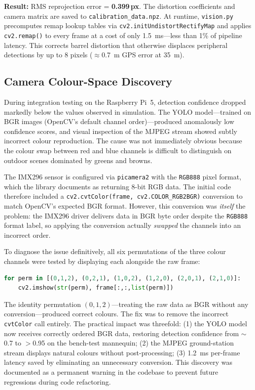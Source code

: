 \documentclass[10pt,a4paper]{article}
\begin{document}
\textbf{Result:} RMS reprojection error = \textbf{0.399\,px}. The distortion coefficients and camera matrix are saved to \texttt{calibration\_data.npz}. At runtime, \texttt{vision.py} precomputes remap lookup tables via \texttt{cv2.initUndistortRectifyMap} and applies \texttt{cv2.remap()} to every frame at a cost of only \SI{1.5}{\milli\second}---less than 1\% of pipeline latency. This corrects barrel distortion that otherwise displaces peripheral detections by up to 8 pixels (${\approx}$\SI{0.7}{\metre} GPS error at \SI{35}{\metre}).

\subsection{Camera Colour-Space Discovery}\label{sec:cal:colour}

During integration testing on the Raspberry Pi~5, detection confidence dropped markedly below the values observed in simulation. The YOLO model---trained on BGR images (OpenCV's default channel order)---produced anomalously low confidence scores, and visual inspection of the MJPEG stream showed subtly incorrect colour reproduction. The cause was not immediately obvious because the colour swap between red and blue channels is difficult to distinguish on outdoor scenes dominated by greens and browns.

The IMX296 sensor is configured via \texttt{picamera2} with the \texttt{RGB888} pixel format, which the library documents as returning 8-bit RGB data. The initial code therefore included a \texttt{cv2.cvtColor(frame, cv2.COLOR\_RGB2BGR)} conversion to match OpenCV's expected BGR format. However, this conversion was \emph{itself} the problem: the IMX296 driver delivers data in BGR byte order despite the \texttt{RGB888} format label, so applying the conversion actually \emph{swapped} the channels into an incorrect order.

To diagnose the issue definitively, all six permutations of the three colour channels were tested by displaying each alongside the raw frame:

\begin{lstlisting}[language=python,numbers=none]
for perm in [(0,1,2), (0,2,1), (1,0,2), (1,2,0), (2,0,1), (2,1,0)]:
    cv2.imshow(str(perm), frame[:,:,list(perm)])
\end{lstlisting}

The identity permutation $(0,1,2)$---treating the raw data as BGR without any conversion---produced correct colours. The fix was to remove the incorrect \texttt{cvtColor} call entirely. The practical impact was threefold: (1) the YOLO model now receives correctly ordered BGR data, restoring detection confidence from ${\sim}$0.7 to $>$0.95 on the bench-test mannequin; (2) the MJPEG ground-station stream displays natural colours without post-processing; (3) \SI{1.2}{\milli\second} per-frame latency saved by eliminating an unnecessary conversion. This discovery was documented as a permanent warning in the codebase to prevent future regressions during code refactoring.
\end{document}
